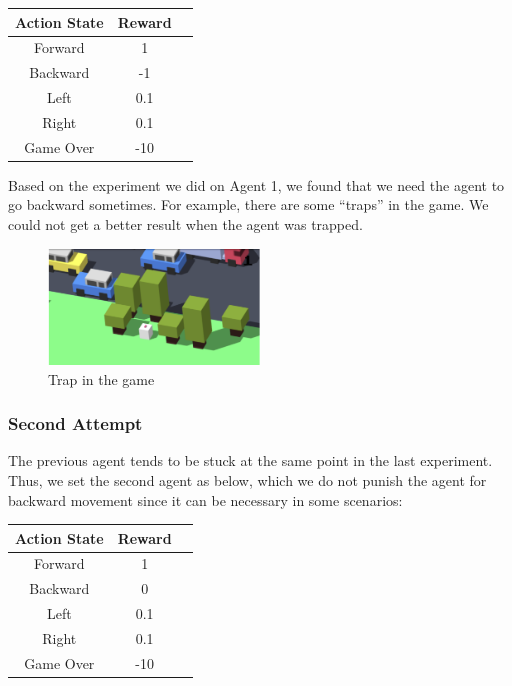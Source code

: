 \documentclass{article}
\begin{document}
\begin{center}
\begin{tabular}{ | c | c| c | } 
\hline
Action State & Reward\\ 
\hline
Forward & 1\\ 
\hline
Backward & -1\\ 
\hline
Left & 0.1\\ 
\hline
Right & 0.1\\ 
\hline
Game Over & -10\\ 
\hline
\end{tabular}
\end{center}

Based on the experiment we did on Agent 1, we found that we need the agent to go backward sometimes. For example, there are some “traps” in the game. We could not get a better result when the agent was trapped.

\begin{figure}[h]
\caption{Trap in the game}
\centering
\includegraphics[width=0.5\textwidth]{trap.png}
\end{figure}

\subsubsection{Second Attempt}
The previous agent tends to be stuck at the same point in the last experiment. Thus, we set the second agent as below, which we do not punish the agent for backward movement since it can be necessary in some scenarios:

\begin{center}
\begin{tabular}{ | c | c| c | } 
\hline
Action State & Reward\\ 
\hline
Forward & 1\\ 
\hline
Backward & 0\\ 
\hline
Left & 0.1\\ 
\hline
Right & 0.1\\ 
\hline
Game Over & -10\\ 
\hline
\end{tabular}
\end{center}
\end{document}
